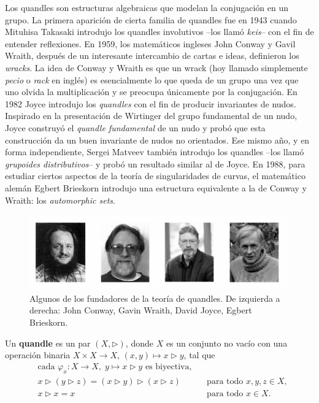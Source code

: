 \documentclass[graybox]{svmult}
\begin{document}
Los quandles son estructuras algebraicas que modelan la conjugación en un
grupo. La primera aparición de cierta familia de quandles fue en 1943
cuando Mituhisa Takasaki introdujo los quandles involutivos --los llamó
\emph{keis}-- con el fin de entender reflexiones. En 1959, los matemáticos
ingleses John Conway y Gavil Wraith, después de un interesante intercambio
de cartas e ideas, definieron los \emph{wracks}. La idea de Conway y Wraith
es que un wrack (hoy llamado simplemente \emph{pecio} o \emph{rack} en
inglés) es esencialmente lo que queda de un grupo una vez que uno olvida la
multiplicación y se preocupa únicamente por la conjugación.  En 1982 Joyce
introdujo los \emph{quandles} con el fin de producir invariantes de nudos.
Inspirado en la presentación de Wirtinger del grupo fundamental de un nudo,
Joyce construyó el \emph{quandle fundamental} de un nudo y probó que esta
construcción da un buen invariante de nudos no orientados.  Ese mismo año,
y en forma independiente, Sergei Matveev también introdujo los quandles
--los llamó \emph{grupoides distributivos}-- y probó un resultado similar
al de Joyce.  En 1988, para estudiar ciertos aspectos de la teoría de
singularidades de curvas, el matemático alemán Egbert Brieskorn introdujo
una estructura equivalente a la de Conway y Wraith: los \emph{automorphic
sets}. 
    \begin{figure}[h]
		\centering
        \includegraphics[scale=0.4]{images/cwjb}
        \caption{Algunos de los fundadores de la teoría de quandles. De
        izquierda a derecha: John Conway, Gavin Wraith, David Joyce, Egbert Brieskorn.}
    \end{figure}

	\begin{definition}
		\label{block:quandle}
		Un \textbf{quandle} es un par $(X,\triangleright)$, donde $X$ es un
		conjunto no vacío con una operación binaria $X\times X\to X$,
		$(x,y)\mapsto x\triangleright y$, tal que
		\begin{align}
			& \text{cada $\varphi_x\colon X\to X,\;y\mapsto x\triangleright y$ es biyectiva},&&\\
			& x\triangleright (y\triangleright z)=(x\triangleright y)\triangleright (x\triangleright z) && \text{para todo $x,y,z\in X$},\\
			& x\triangleright x=x && \text{para todo $x\in X$}.
		\end{align}
	\end{definition}
\end{document}
